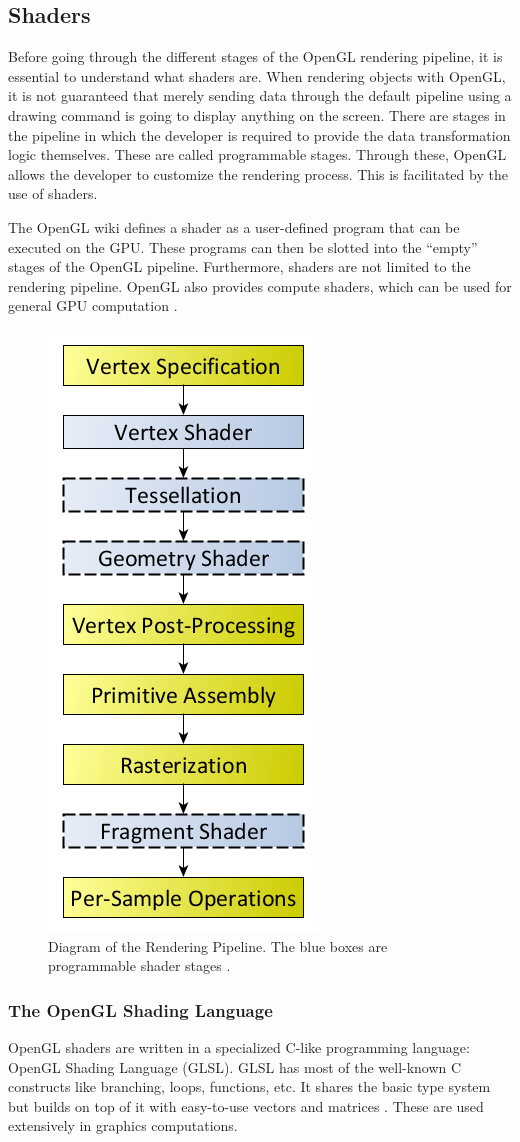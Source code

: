 \documentclass[
  digital,     %
  oneside,     %
  nosansbold,  %
  nocolorbold, %
  lof,         %
  lot,         %
]{fithesis4}
\begin{document}
\subsection{Shaders}
Before going through the different stages of the OpenGL rendering pipeline, it is essential to
understand what shaders are. When rendering objects with OpenGL, it is not guaranteed that
merely sending data through the default pipeline using a drawing command is going to display
anything on the screen. There are stages in the pipeline in which the developer is required to provide the data transformation
logic themselves. These are called programmable stages. Through these, OpenGL allows
the developer to customize the rendering process. This is facilitated by the use of shaders.

The OpenGL wiki defines a shader as a user-defined program that can be executed on the GPU.
These programs can then be slotted into the \enquote{empty} stages of the OpenGL pipeline.
Furthermore, shaders are not limited to the rendering pipeline.
OpenGL also provides compute shaders, which can be used for general GPU computation \cite{openglwiki-shader}.

\begin{figure}[H]
    \centering
    \includegraphics[height=0.75\linewidth]{images/RenderingPipeline.png}
    \caption{Diagram of the Rendering Pipeline. The blue boxes are programmable shader stages
    \cite{openglwiki-rendering-pipeline}.}
    \label{fig:rendering-pipeline}
\end{figure}

\subsubsection{The OpenGL Shading Language}
OpenGL shaders are written in a specialized C-like programming language: OpenGL Shading
Language (GLSL). GLSL has most of the well-known C constructs like branching, loops, functions, etc.
It shares the basic type system but builds on top of it with easy-to-use vectors and matrices \cite{openglwiki-glsl}.
These are used extensively in graphics computations.
\end{document}
